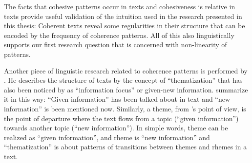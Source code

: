 The facts that cohesive patterns occur in texts and cohesiveness is relative in texts provide useful validation of the intuition used in the research presented in this thesis: Coherent texts reveal some regularities in their structure that can be encoded by the frequency of coherence patterns. 
All of this also linguistically supports our first research question that is concerned with \mbox{non-linearity} of patterns. 

Another piece of linguistic research related to coherence patterns is performed by . 
He describes the structure of texts by the concept of ``thematization'' that has also been noticed by  as ``information focus'' or \mbox{given-new} information. 
 summarize it in this way: ``Given information'' has been talked about in text and ``new information'' is been mentioned now.  
Similarly, a theme, from 's point of view, is the point of departure where the text flows from a topic (``given information'') towards another topic (``new information''). 
In simple words, theme can be realized as ``given information'', and rheme is ``new information'' and ``thematization'' is about patterns of transitions between themes and rhemes in a text. 

